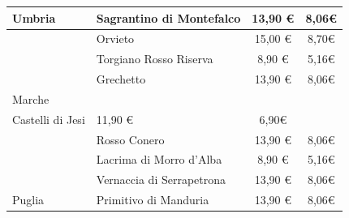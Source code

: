 \documentclass[12pt, a4paper]{article}
\begin{document}
\begin{longtable}{@{}|l|l|c|c|}
Umbria               & Sagrantino di Montefalco                                                  & 13,90 €                                                         & 8,06€                                                                                 \\ \hline
& Orvieto                                                                   & 15,00 €                                                         & 8,70€                                                                                 \\ \hline
& Torgiano Rosso Riserva                                                    & 8,90 €                                                          & 5,16€                                                                                 \\ \hline
& Grechetto                                                                 & 13,90 €                                                         & 8,06€                                                                                 \\ \hline
Marche               & \begin{tabular}[c]{@{}l@{}}Verdicchio dei\\ Castelli di Jesi\end{tabular} & 11,90 €                                                         & 6,90€                                                                                 \\ \hline
& Rosso Conero                                                              & 13,90 €                                                         & 8,06€                                                                                 \\ \hline
& Lacrima di Morro d'Alba                                                   & 8,90 €                                                          & 5,16€                                                                                 \\ \hline
& Vernaccia di Serrapetrona                                                 & 13,90 €                                                         & 8,06€                                                                                 \\ \hline
Puglia               & Primitivo di Manduria                                                     & 13,90 €                                                         & 8,06€                                                                                 \\ \hline

\end{longtable}
\end{document}
